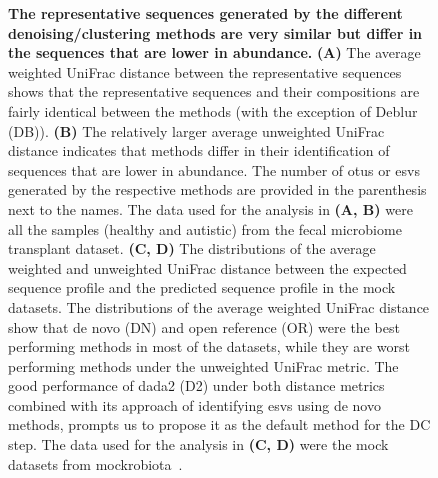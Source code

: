   \begin{figure}[H]
    \centering
    \caption{
      \textbf{The representative sequences generated by the different denoising/clustering methods are very similar but differ in the sequences that are lower in abundance.}
      \textbf{(A)} The average weighted UniFrac distance between the representative sequences shows that the representative sequences and their compositions are fairly identical between the methods (with the exception of Deblur (DB)).
      \textbf{(B)} The relatively larger average unweighted UniFrac distance indicates that methods differ in their identification of sequences that are lower in abundance.
      The number of \ac{otu}s or \ac{esv}s generated by the respective methods are provided in the parenthesis next to the names.
      The data used for the analysis in \textbf{(A, B)} were all the samples (healthy and autistic) from the fecal microbiome transplant dataset.
      \textbf{(C, D)} The distributions of the average weighted and unweighted UniFrac distance between the expected sequence profile and the predicted sequence profile in the mock datasets.
      The distributions of the average weighted UniFrac distance show that de novo (DN) and open reference (OR) were the best performing methods in most of the datasets, while they are worst performing methods under the unweighted UniFrac metric.
      The good performance of dada2 (D2) under both distance metrics combined with its approach of identifying \ac{esv}s using de novo methods, prompts us to propose it as the default method for the DC step.
      The data used for the analysis in \textbf{(C, D)} were the mock datasets from mockrobiota~\cite{Bokulich2016}.
    }
    \label{fig:figure2}
  \end{figure}

